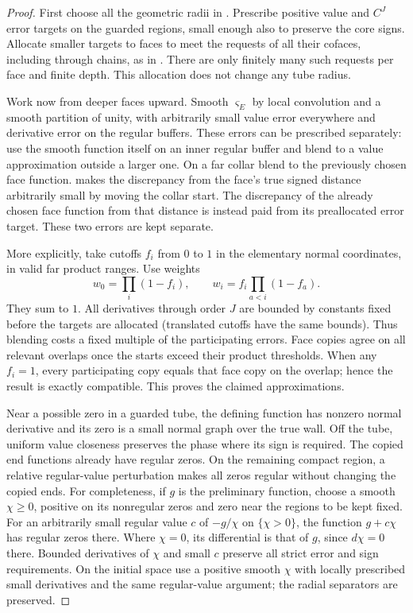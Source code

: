 \documentclass[11pt]{article}
\numberwithin{equation}{section}
\theoremstyle{definition}
\theoremstyle{remark}
\begin{document}
\begin{proof}
First choose all the geometric radii in .  Prescribe
positive value and $C^J$ error targets on the guarded regions, small
enough also to preserve the core signs.  Allocate smaller targets to
faces to meet the requests of all their cofaces, including through
chains, as in .  There are only finitely many
such requests per face and finite depth.  This allocation does not
change any tube radius.

Work now from deeper faces upward.  Smooth $\varsigma_E$ by local
convolution and a smooth partition of unity, with arbitrarily small
value error everywhere and derivative error on the regular buffers.
These errors can be prescribed separately: use the smooth function
itself on an inner regular buffer and blend to a value approximation
outside a larger one.  On a far collar blend to the previously chosen
face function.   makes the discrepancy from the
face's true signed distance arbitrarily small by moving the collar
start.  The discrepancy of the already chosen face function from that
distance is instead paid from its preallocated error target.  These
two errors are kept separate.

More explicitly, take cutoffs $f_i$ from $0$ to $1$ in the elementary
normal coordinates, in valid far product ranges.  Use weights
\[
 w_0=\prod_i(1-f_i),\qquad
 w_i=f_i\prod_{a<i}(1-f_a).
\]
They sum to $1$.  All derivatives through order $J$ are bounded by
constants fixed before the targets are allocated (translated cutoffs
have the same bounds).  Thus blending costs a fixed multiple of the
participating errors.  Face copies agree on all relevant overlaps once
the starts exceed their product thresholds.  When any $f_i=1$, every
participating copy equals that face copy on the overlap; hence the
result is exactly compatible.  This proves the claimed approximations.

Near a possible zero in a guarded tube, the defining function has
nonzero normal derivative and its zero is a small normal graph over the
true wall.  Off the tube, uniform value closeness preserves the phase
where its sign is required.  The copied end functions already have
regular zeros.  On the remaining compact region, a relative regular-value
perturbation makes all zeros regular without changing the copied ends.
For completeness, if $g$ is the preliminary function, choose a smooth
$\chi\ge0$, positive on its nonregular zeros and zero near the regions
to be kept fixed.  For an arbitrarily small regular value $c$ of
$-g/\chi$ on $\{\chi>0\}$, the function $g+c\chi$ has regular zeros
there.  Where $\chi=0$, its differential is that of $g$, since
$d\chi=0$ there.  Bounded derivatives of $\chi$ and small $c$ preserve
all strict error and sign requirements.  On the initial space use a
positive smooth $\chi$ with locally prescribed small derivatives and
the same regular-value argument; the radial separators are preserved.


\end{proof}
\end{document}

